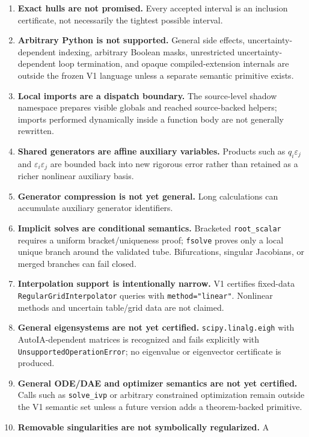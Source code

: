 \documentclass[11pt]{article}
\begin{document}
\begin{enumerate}[leftmargin=*]
\item \textbf{Exact hulls are not promised.}  Every accepted interval is an
inclusion certificate, not necessarily the tightest possible interval.
\item \textbf{Arbitrary Python is not supported.}  General side effects,
uncertainty-dependent indexing, arbitrary Boolean masks, unrestricted
uncertainty-dependent loop termination, and opaque compiled-extension internals
are outside the frozen V1 language unless a separate semantic primitive exists.
\item \textbf{Local imports are a dispatch boundary.}  The source-level shadow
namespace prepares visible globals and reached source-backed helpers; imports
performed dynamically inside a function body are not generally rewritten.
\item \textbf{Shared generators are affine auxiliary variables.}  Products such
as \(q_i\varepsilon_j\) and \(\varepsilon_i\varepsilon_j\) are bounded back into
new rigorous error rather than retained as a richer nonlinear auxiliary basis.
\item \textbf{Generator compression is not yet general.}  Long calculations can
accumulate auxiliary generator identifiers.
\item \textbf{Implicit solves are conditional semantics.}  Bracketed
\texttt{root\_scalar} requires a uniform bracket/uniqueness proof;
\texttt{fsolve} proves only a local unique branch around the validated tube.
Bifurcations, singular Jacobians, or merged branches can fail closed.
\item \textbf{Interpolation support is intentionally narrow.}  V1 certifies
fixed-data \texttt{RegularGrid\allowbreak Interpolator} queries with \texttt{method="linear"}.  Nonlinear
methods and uncertain table/grid data are not claimed.
\item \textbf{General eigensystems are not yet certified.}
\texttt{scipy.linalg.eigh} with AutoIA-dependent matrices is recognized and fails
explicitly with \texttt{UnsupportedOperationError}; no eigenvalue or eigenvector
certificate is produced.
\item \textbf{General ODE/DAE and optimizer semantics are not yet certified.}
Calls such as \texttt{solve\_ivp} or arbitrary constrained optimization remain
outside the V1 semantic set unless a future version adds a theorem-backed
primitive.
\item \textbf{Removable singularities are not symbolically regularized.}  A

\end{enumerate}
\end{document}
